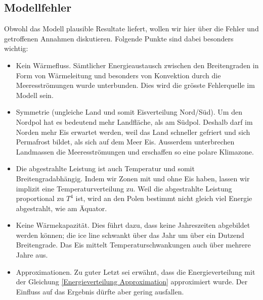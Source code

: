 \begin{refsection}
\section{Modellfehler}
Obwohl das Modell plausible Resultate liefert, wollen wir hier über die Fehler und getroffenen Annahmen diskutieren. Folgende Punkte sind dabei besonders wichtig:
\begin{itemize}
	\item Kein Wärmefluss. Sämtlicher Energieaustausch zwischen den Breitengraden in Form von Wärmeleitung und besonders von Konvektion durch die Meeresströmungen wurde unterbunden. Dies wird die grösste Fehlerquelle im Modell sein.
	\item Symmetrie (ungleiche Land und somit Eisverteilung Nord/Süd). Um den Nordpol hat es bedeutend mehr Landfläche, als am Südpol. Deshalb darf im Norden mehr Eis erwartet werden, weil das Land schneller gefriert und sich Permafrost bildet, als sich auf dem Meer Eis. Ausserdem unterbrechen Landmassen die Meeresströmungen und erschaffen so eine polare Klimazone.
	\item Die abgestrahlte Leistung ist auch Temperatur und somit Breitengradabhängig. Indem wir Zonen mit und ohne Eis haben, lassen wir implizit eine Temperaturverteilung zu. Weil die abgestrahlte Leistung proportional zu $T^4$ ist, wird an den Polen bestimmt nicht gleich viel Energie abgestrahlt, wie am Äquator.
	\item Keine Wärmekapazität. Dies führt dazu, dass keine Jahreszeiten abgebildet werden können; die ice line schwankt über das Jahr um über ein Dutzend Breitengrade. Das Eis mittelt Temperaturschwankungen auch über mehrere Jahre aus.
	\item Approximationen. Zu guter Letzt sei erwähnt, dass die Energieverteilung mit der Gleichung \ref{Energieverteilung Approximation} approximiert wurde. Der Einfluss auf das Ergebnis dürfte aber gering ausfallen.
\end{itemize}

\end{refsection}
